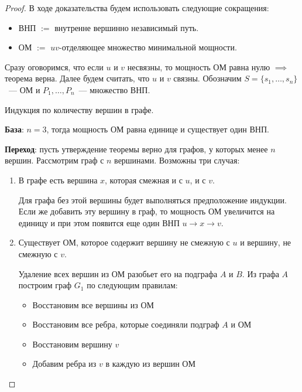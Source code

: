 \begin{proof}
  В ходе доказательства будем использовать следующие сокращения:
  \begin{itemize}
    \item ВНП \(:=\) внутренне вершинно независимый путь.
    \item ОМ \(:=\) \(uv\)-отделяющее множество минимальной мощности.
  \end{itemize}

  Сразу оговоримся, что если \(u\) и \(v\) несвязны, то мощность ОМ равна нулю
  \(\implies\) теорема верна. Далее будем считать, что \(u\) и \(v\) связны.
  Обозначим \(S = \{ s_{1}, \dotsc, s_{n} \}\)~--- ОМ и
  \(P_{1}, \dotsc, P_{n}\)~--- множество ВНП.

  Индукция по количеству вершин в графе.

  \textbf{База}: \(n = 3\), тогда мощность ОМ равна единице и существует один
  ВНП.

  \textbf{Переход}: пусть утверждение теоремы верно для графов, у которых менее
  \(n\) вершин. Рассмотрим граф с \(n\) вершинами. Возможны три случая:

  \begin{enumerate}
    \item В графе есть вершина \(x\), которая смежная и с \(u\), и с \(v\).

    Для графа без этой вершины будет выполняться предположение индукции. Если же
    добавить эту вершину в граф, то мощность ОМ увеличится на единицу и при этом
    появится еще один ВНП \(u \to x \to v\).

    

    \item Существует ОМ, которое содержит вершину не смежную с \(u\) и вершину,
    не смежную с \(v\).

    Удаление всех вершин из ОМ разобьет его на подграфа \(A\) и \(B\). Из графа
    \(A\) построим граф \(G_{1}\) по следующим правилам:

    \begin{itemize}
      \item Восстановим все вершины из ОМ
      \item Восстановим все ребра, которые соединяли подграф \(A\) и ОМ
      \item Восстановим вершину \(v\)
      \item Добавим ребра из \(v\) в каждую из вершин ОМ
    \end{itemize}


\end{enumerate}
\end{proof}
